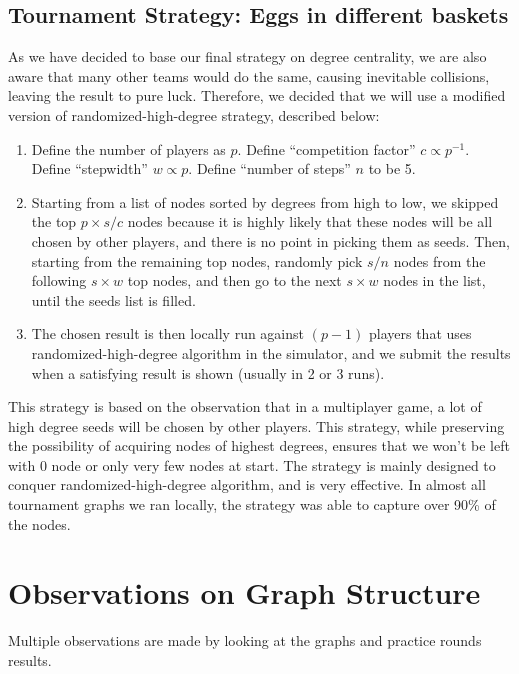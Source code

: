 \documentclass[12pt]{article}
\begin{document}
\subsection{Tournament Strategy: Eggs in different baskets}
As we have decided to base our final strategy on degree centrality, we are also aware that many other teams would do the same, causing inevitable collisions, leaving the result to pure luck. Therefore, we decided that we will use a modified version of randomized-high-degree strategy, described below:
\begin{enumerate}
\item Define the number of players as $p$. Define ``competition factor'' $c \propto p^{-1}$. Define ``stepwidth'' $w \propto p$. Define ``number of steps'' $n$ to be 5. 
\item Starting from a list of nodes sorted by degrees from high to low, we skipped the top $p \times s / c$ nodes because it is highly likely that these nodes will be all chosen by other players, and there is no point in picking them as seeds. Then, starting from the remaining top nodes, randomly pick $s / n$ nodes from the following $s \times w$ top nodes, and then go to the next $s \times w$ nodes in the list, until the seeds list is filled.
\item The chosen result is then locally run against $(p - 1)$ players that uses randomized-high-degree algorithm in the simulator, and we submit the results when a satisfying result is shown (usually in 2 or 3 runs). 
\end{enumerate}
This strategy is based on the observation that in a multiplayer game, a lot of high degree seeds will be chosen by other players. This strategy, while preserving the possibility of acquiring nodes of highest degrees, ensures that we won't be left with 0 node or only very few nodes at start. The strategy is mainly designed to conquer randomized-high-degree algorithm, and is very effective. In almost all tournament graphs we ran locally, the strategy was able to capture over 90\% of the nodes.

\section{Observations on Graph Structure}
Multiple observations are made by looking at the graphs and practice rounds results.
\end{document}
